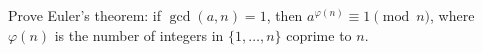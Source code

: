 Prove Euler's theorem: if $\gcd(a,n)=1$, then $a^{\varphi(n)}\equiv1\pmod n$, where $\varphi(n)$ is the number of integers in $\{1,\dots,n\}$ coprime to $n$.
